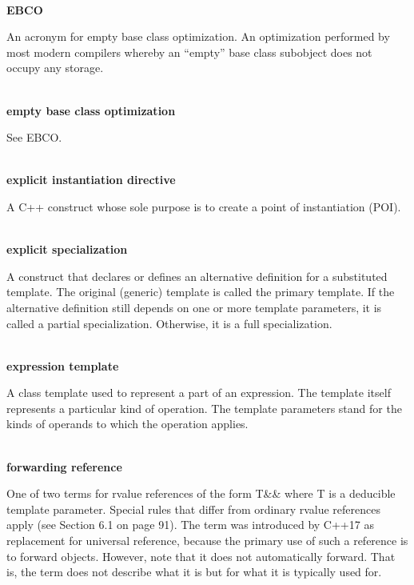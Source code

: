 \hspace*{\fill} \\ %
\noindent
\textbf{EBCO}

An acronym for empty base class optimization. An optimization performed by most modern compilers whereby an “empty” base class subobject does not occupy any storage.

\hspace*{\fill} \\ %
\noindent
\textbf{empty base class optimization}

See EBCO.

\hspace*{\fill} \\ %
\noindent
\textbf{explicit instantiation directive}

A C++ construct whose sole purpose is to create a point of instantiation (POI).

\hspace*{\fill} \\ %
\noindent
\textbf{explicit specialization}

A construct that declares or defines an alternative definition for a substituted template. The original (generic) template is called the primary template. If the alternative definition still depends on one or more template parameters, it is called a partial specialization. Otherwise, it is a full specialization.

\hspace*{\fill} \\ %
\noindent
\textbf{expression template}

A class template used to represent a part of an expression. The template itself represents a particular kind of operation. The template parameters stand for the kinds of operands to which the operation applies.

\hspace*{\fill} \\ %
\noindent
\textbf{forwarding reference}

One of two terms for rvalue references of the form T\&\& where T is a deducible template parameter. Special rules that differ from ordinary rvalue references apply (see Section 6.1 on page 91). The term was introduced by C++17 as replacement for universal reference, because the primary use of such a reference is to forward objects. However, note that it does not automatically forward. That is, the term does not describe what it is but for what it is typically used for.

